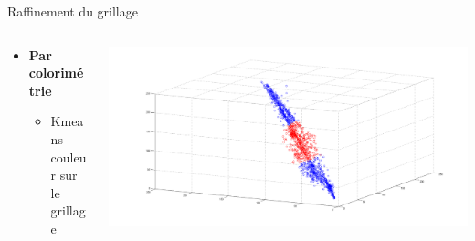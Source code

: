 \documentclass[11pt]{beamer}
\begin{document}
\begin{frame}{Raffinement du grillage}

	\begin{columns}
		\begin{column}{5cm}
		\begin{itemize}
			\item\textbf{Par colorimétrie}
			\begin{itemize}
				\item Kmeans couleur sur le grillage
			\end{itemize}
		\end{itemize}
		\end{column}

		\begin{column}{5cm}
			\includegraphics[width = 1 \columnwidth]{fig/Kmeans.png}
		\end{column}
	\end{columns}
	

\end{frame}
\end{document}
